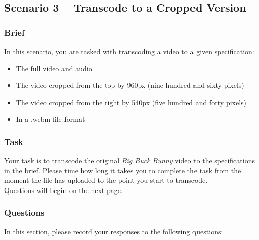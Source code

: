 \subsection{Scenario 3 – Transcode to a Cropped Version}
\subsubsection{Brief}
In this scenario, you are tasked with transcoding a video to a given specification:
\begin{itemize}
    \item The full video and audio
    \item The video cropped from the top by 960px (nine hundred and sixty pixels)
    \item The video cropped from the right by 540px (five hundred and forty pixels)
    \item In a .webm file format
\end{itemize}

\subsubsection{Task}
Your task is to transcode the original \emph{Big Buck Bunny} video to the specifications in the brief.
Please time how long it takes you to complete the task from the moment the file has uploaded to the point you start to transcode. \\
Questions will begin on the next page.

\clearpage

\subsubsection{Questions}

In this section, please record your responses to the following questions:

